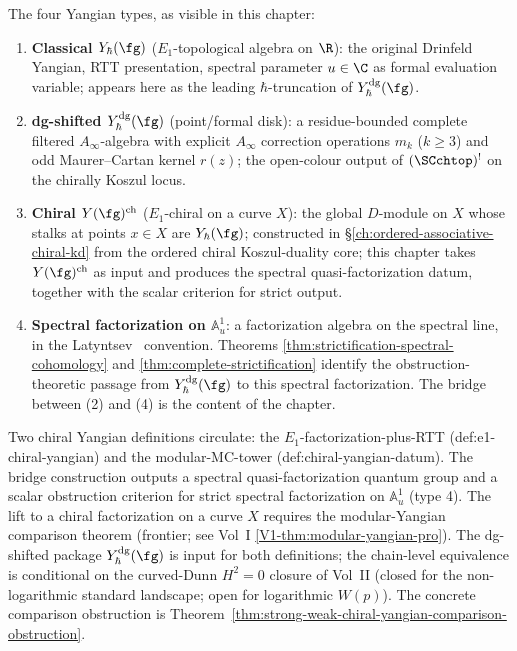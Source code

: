 \begin{convention}
\label{conv:dg-shifted-bridge-yangian-types}
The four Yangian types, as visible in this chapter:
\begin{enumerate}[label=\textup{(\arabic*)}]
\item \textbf{Classical $Y_\hbar(\fg)$} ($E_1$-topological algebra
on $\R$): the original Drinfeld Yangian, RTT presentation,
spectral parameter $u\in\C$ as formal evaluation variable;
appears here as the leading $\hbar$-truncation of
$Y^{\mathrm{dg}}_\hbar(\fg)$.
\item \textbf{dg-shifted $Y^{\mathrm{dg}}_\hbar(\fg)$} (point/formal
disk): a residue-bounded complete filtered $A_\infty$-algebra with
explicit $A_\infty$ correction operations $m_k$ ($k\ge 3$) and odd
Maurer--Cartan kernel $r(z)$; the open-colour output of
$(\SCchtop)^{!}$ on the chirally Koszul locus.
\item \textbf{Chiral $Y(\fg)^{\mathrm{ch}}$} ($E_1$-chiral on a
curve $X$): the global $D$-module on $X$ whose stalks at points
$x\in X$ are $Y_\hbar(\fg)$; constructed in
\S\ref{ch:ordered-associative-chiral-kd} from the ordered
chiral Koszul-duality core; this chapter takes
$Y(\fg)^{\mathrm{ch}}$ as input and produces the spectral
quasi-factorization datum, together with the scalar criterion for
strict output.
\item \textbf{Spectral factorization on $\mathbb{A}^1_u$}:
a factorization algebra on the spectral line, in the
Latyntsev~\cite{Latyntsev23} convention. Theorems
\ref{thm:strictification-spectral-cohomology} and
\ref{thm:complete-strictification} identify the obstruction-theoretic
passage from $Y^{\mathrm{dg}}_\hbar(\fg)$ to this spectral
factorization. The bridge between (2) and (4) is the content of the
chapter.
\end{enumerate}
\end{convention}

\begin{remark}
\label{rem:dg-shifted-bridge-two-definitions}
Two chiral Yangian definitions circulate: the
$E_1$-factorization-plus-RTT (def:e1-chiral-yangian) and the
modular-MC-tower (def:chiral-yangian-datum). The bridge construction
outputs a spectral quasi-factorization quantum group and a scalar
obstruction criterion for strict spectral factorization on
$\mathbb{A}^1_u$ (type 4). The lift to a chiral factorization on a
curve $X$ requires the modular-Yangian comparison theorem (frontier;
see Vol~I \cref{V1-thm:modular-yangian-pro}). The dg-shifted package
$Y^{\mathrm{dg}}_\hbar(\fg)$ is input for both definitions; the
chain-level equivalence is conditional on the curved-Dunn $H^2 = 0$
closure of Vol~II (closed for the non-logarithmic standard landscape;
open for logarithmic $W(p)$). The concrete comparison obstruction is
Theorem~\ref{thm:strong-weak-chiral-yangian-comparison-obstruction}.
\end{remark}

